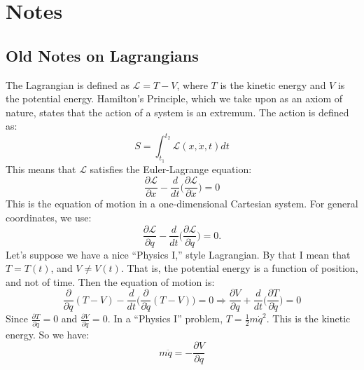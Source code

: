 \section{Notes}
    \subsection{Old Notes on Lagrangians}
        The Lagrangian is defined as $\mathcal{L}=T-V$,
        where $T$ is the kinetic energy and $V$ is the
        potential energy. Hamilton's Principle,
        which we take upon as an axiom of nature,
        states that the action of a system is an extremum.
        The action is defined as:
        \begin{equation*}
            S=\int_{t_1}^{t_2}\mathcal{L}(x,\dot{x},t)dt
        \end{equation*}
        This means that $\mathcal{L}$ satisfies the Euler-Lagrange equation:
        \begin{equation*} 
            \frac{\partial \mathcal{L}}{\partial{x}}
            -
            \frac{d}{dt}\big(
                \frac{\partial\mathcal{L}}{\partial\dot{x}}
            \big)
            =0
        \end{equation*}
        This is the equation of motion in a one-dimensional
        Cartesian system. For general coordinates, we use:
        \begin{equation*}
            \frac{\partial\mathcal{L}}{\partial q}
            -\frac{d}{dt}\big(
                \frac{\partial\mathcal{L}}{\partial\dot{q}}
            \big)
            =0.
        \end{equation*}
        Let's suppose we have a nice ``Physics I,'' style Lagrangian.
        By that I mean that $T = T(t)$, and $V \ne V(t)$.
        That is, the potential energy is a function of position,
        and not of time. Then the equation of motion is:
        \begin{equation*}
            \frac{\partial}{\partial q}(T-V)-\frac{d}{dt}
            \big(\frac{\partial}{\partial\dot{q}}(T-V)\big)=0
            \Rightarrow
            \frac{\partial{V}}{\partial{q}}
            +\frac{d}{dt}\big(
                \frac{\partial{T}}{\partial\dot{q}}
            \big)
            =0
        \end{equation*}
        Since $\frac{\partial{T}}{\partial{q}}=0$
        and $\frac{\partial{V}}{\partial\dot{q}}=0$.
        In a ``Physics I'' problem, $T=\frac{1}{2}m\dot{q}^2$.
        This is the kinetic energy. So we have:
        \begin{equation}
        \nonumber m\ddot{q} = -\frac{\partial V}{\partial q}
        \end{equation}
